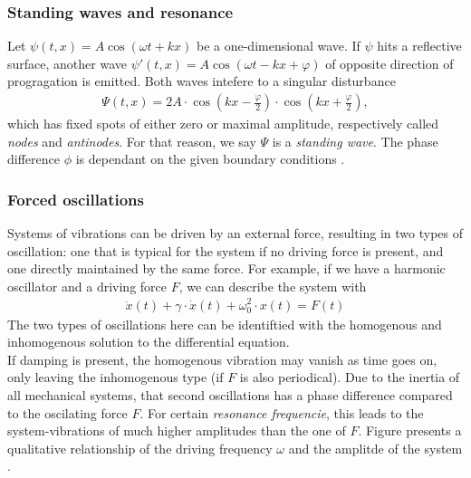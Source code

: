 \documentclass{subfiles}
\begin{document}
        \subsubsection*{Standing waves and resonance}
        Let $\psi(t,x)=A\cos(\omega t+kx)$ be a one-dimensional wave. If $\psi$ hits a reflective surface, another wave $\psi'(t,x)=A\cos(\omega t-kx+\varphi)$ of opposite direction of progragation is emitted. Both waves intefere to a singular disturbance
        \begin{align*}
            \Psi(t,x)=2A\cdot\cos(kx-\frac{\varphi}{2})\cdot\cos(kx+\frac{\varphi}{2}),
        \end{align*}
        which has fixed spots of either zero or maximal amplitude, respectively called \textit{nodes} and \textit{antinodes}. For that reason, we say $\Psi$ is a \textit{standing wave}. The phase difference $\phi$ is dependant on the given boundary conditions \cite[p.405]{demtroeder1.9}.\\

        \subsubsection*{Forced oscillations}
            Systems of vibrations can be driven by an external force, resulting in two types of oscillation: one that is typical for the system if no driving force is present, and one directly maintained by the same force. For example, if we have a harmonic oscillator and a driving force $F$, we can describe the system with
            \begin{align*}
                \ddot x(t)+\gamma\cdot\dot x(t)+\omega_0^2\cdot x(t)=F(t)
            \end{align*}
            The two types of oscillations here can be identiftied with the homogenous and inhomogenous solution to the differential equation.\\

            \noindent If damping is present, the homogenous vibration may vanish as time goes on, only leaving the inhomogenous type (if $F$ is also periodical). Due to the inertia of all mechanical systems, that second oscillations has a phase difference compared to the oscilating force $F$. For certain \textit{resonance frequencie}, this leads to the system-vibrations of much higher amplitudes than the one of $F$. Figure presents a qualitative relationship of the driving frequency $\omega$ and the amplitde of the system \cite[374-377]{demtroeder1.9}.
\end{document}
